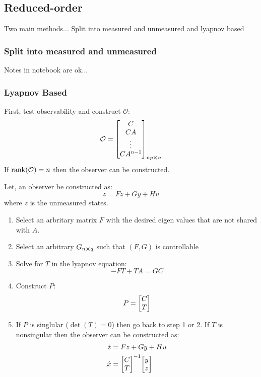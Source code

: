 \documentclass[]{article}
\newcommand{\obsv}{\mathcal{O}}
\begin{document}
	\subsection*{Reduced-order}
		Two main methods... Split into measured and unmeasured and lyapnov based
		\subsubsection*{Split into measured and unmeasured}
			Notes in notebook are ok...
		\subsubsection*{Lyapnov Based}
		First, test observability and construct $\obsv$:
		\begin{displaymath}
			\obsv = \mqty[C\\ CA\\ \vdots\\ C A^{n-1}]_{n p \cross n}
		\end{displaymath}
		If $\rank(\obsv) = n$ then the observer can be constructed.
		
		Let, an observer be constructed as:
		\begin{displaymath}
			\dot{z} = F z + G y + H u
		\end{displaymath}
		where $z$ is the unmeasured states.
		\begin{enumerate}
			\item Select an arbritary matrix $F$ with the desired eigen values that are not shared with $A$.
			\item Select an arbitrary $G_{n\cross q}$ such that $(F,G)$ is controllable
			\item Solve for $T$ in the lyapnov equation:
			\begin{displaymath}
				-F T + T A = G C
			\end{displaymath}
			\item Construct $P$:
			\begin{displaymath}
				P = \mqty[C \\ T]
			\end{displaymath}
			\item If $P$ is singlular ($\det(T) = 0$) then go back to step 1 or 2. If $T$ is nonsingular then the observer can be constructed as:
			\begin{align*}
				\dot{z} &= F z + G y + H u\\
				\hat{x} &= \mqty[C\\T]^{-1} \mqty[y\\z]
			\end{align*}
		\end{enumerate}
\end{document}
